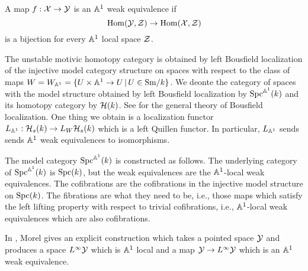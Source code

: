\documentclass{amsart}%
\begin{document}
\begin{definition}
  A map $f: \mathcal{X} \to \mathcal{Y}$ is an $\mathbb{A}^1$ weak equivalence if 
  \begin{equation*}
    \operatorname{Hom}(\mathcal{Y}, \mathcal{Z}) \to \operatorname{Hom}(\mathcal{X}, \mathcal{Z})
  \end{equation*}
  is a bijection for every $\mathbb{A}^1$ local space $\mathcal{Z}$.
\end{definition}

The unstable motivic homotopy category is obtained by left Bousfield
localization of the injective model category structure on spaces with
respect to the class of maps
$W = W_{\mathbb{A}^1} = \{ U \times \mathbb{A}^1 \to U \, \vert \, U \in \mathrm{Sm}/k\}$. We
deonte the category of spaces with the model structure obtained by
left Bousfield localization by $\mathrm{Spc}^{\mathbb{A}^1}(k)$ and its homotopy
category by $\mathcal{H}(k)$. See %
\cite[Chapter 3]{Hhorn} for the general theory of Bousfield
localization. One thing we obtain is a localization functor
$L_{\mathbb{A}^1} : \mathcal{H}_s(k) \to L_{W}\mathcal{H}_s(k)$ which is a left Quillen
functor.  In particular, $L_{\mathbb{A}^1}$ sends sends $\mathbb{A}^1$ weak
equivalences to isomorphisms.

The model category $\mathrm{Spc}^{\mathbb{A}^1}(k)$ is constructed as follows. The
underlying category of $\mathrm{Spc}^{\mathbb{A}^1}(k)$ is $\mathrm{Spc}(k)$, but the weak
equivalences are the $\mathbb{A}^1$-local weak equivalences. The
cofibrations are the cofibrations in the injective model structure on
$\mathrm{Spc}(k)$. The fibrations are what they need to be, i.e., those maps
which satisfy the left lifting property with respect to trivial
cofibrations, i.e., $\mathbb{A}^1$-local weak equivalences which are also
cofibrations.


In \cite[Proposition 3.2.3]{Mor05}, Morel gives an explicit
construction which takes a pointed space $\mathcal{Y}$ and produces a space
$L^{\infty}\mathcal{Y}$ which is $\mathbb{A}^1$ local and a map
$\mathcal{Y} \to L^{\infty}\mathcal{Y}$ which is an $\mathbb{A}^1$ weak equivalence. 

\end{document}
